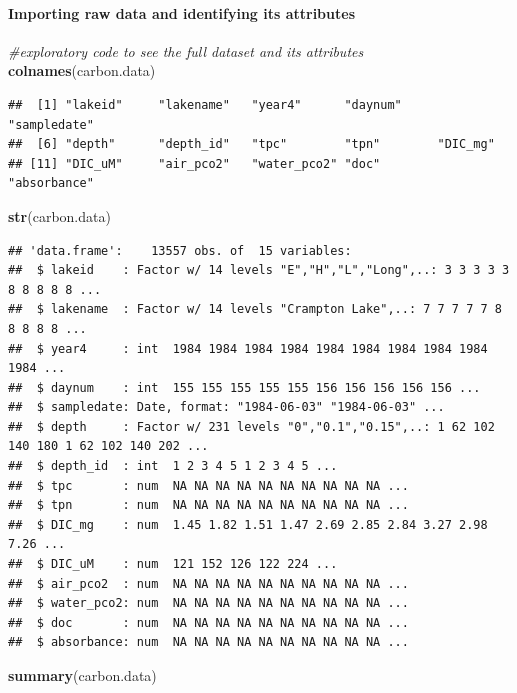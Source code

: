 \documentclass[12pt,]{article}
\newenvironment{Shaded}{\begin{snugshade}}{\end{snugshade}}
\newcommand{\KeywordTok}[1]{\textcolor[rgb]{0.13,0.29,0.53}{\textbf{#1}}}
\newcommand{\CommentTok}[1]{\textcolor[rgb]{0.56,0.35,0.01}{\textit{#1}}}
\newcommand{\NormalTok}[1]{#1}
\let\oldparagraph\paragraph
\renewcommand{\paragraph}[1]{\oldparagraph{#1}\mbox{}}
\begin{document}
\paragraph{Importing raw data and identifying its
attributes}\label{importing-raw-data-and-identifying-its-attributes}

\begin{Shaded}
\begin{Highlighting}[]
\CommentTok{#exploratory code to see the full dataset and its attributes}
\KeywordTok{colnames}\NormalTok{(carbon.data)}
\end{Highlighting}
\end{Shaded}

\begin{verbatim}
##  [1] "lakeid"     "lakename"   "year4"      "daynum"     "sampledate"
##  [6] "depth"      "depth_id"   "tpc"        "tpn"        "DIC_mg"    
## [11] "DIC_uM"     "air_pco2"   "water_pco2" "doc"        "absorbance"
\end{verbatim}

\begin{Shaded}
\begin{Highlighting}[]
\KeywordTok{str}\NormalTok{(carbon.data)}
\end{Highlighting}
\end{Shaded}

\begin{verbatim}
## 'data.frame':    13557 obs. of  15 variables:
##  $ lakeid    : Factor w/ 14 levels "E","H","L","Long",..: 3 3 3 3 3 8 8 8 8 8 ...
##  $ lakename  : Factor w/ 14 levels "Crampton Lake",..: 7 7 7 7 7 8 8 8 8 8 ...
##  $ year4     : int  1984 1984 1984 1984 1984 1984 1984 1984 1984 1984 ...
##  $ daynum    : int  155 155 155 155 155 156 156 156 156 156 ...
##  $ sampledate: Date, format: "1984-06-03" "1984-06-03" ...
##  $ depth     : Factor w/ 231 levels "0","0.1","0.15",..: 1 62 102 140 180 1 62 102 140 202 ...
##  $ depth_id  : int  1 2 3 4 5 1 2 3 4 5 ...
##  $ tpc       : num  NA NA NA NA NA NA NA NA NA NA ...
##  $ tpn       : num  NA NA NA NA NA NA NA NA NA NA ...
##  $ DIC_mg    : num  1.45 1.82 1.51 1.47 2.69 2.85 2.84 3.27 2.98 7.26 ...
##  $ DIC_uM    : num  121 152 126 122 224 ...
##  $ air_pco2  : num  NA NA NA NA NA NA NA NA NA NA ...
##  $ water_pco2: num  NA NA NA NA NA NA NA NA NA NA ...
##  $ doc       : num  NA NA NA NA NA NA NA NA NA NA ...
##  $ absorbance: num  NA NA NA NA NA NA NA NA NA NA ...
\end{verbatim}

\begin{Shaded}
\begin{Highlighting}[]
\KeywordTok{summary}\NormalTok{(carbon.data)}
\end{Highlighting}
\end{Shaded}
\end{document}
